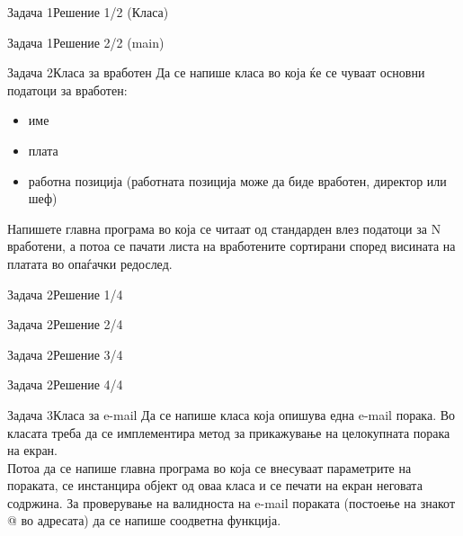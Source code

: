 \begin{frame}[fragile]{Задача 1}{Решение 1/2 (Класа)}

\end{frame}

\begin{frame}[fragile]{Задача 1}{Решение 2/2 (main)}

\end{frame}

\begin{frame}{Задача 2}{Класа за вработен}
Да се напише класа во која ќе се чуваат основни податоци за вработен:
\begin{itemize}
  \item име
  \item плата
  \item работна позиција (работната позиција може да биде вработен, директор
или шеф)
\end{itemize}
Напишете главна програма во која се читаат од стандарден влез податоци за N
вработени, а потоа се пачати листа на вработените сортирани според висината на
платата во опаѓачки редослед.
\end{frame}

\begin{frame}[fragile]{Задача 2}{Решение 1/4}

\end{frame}

\begin{frame}[fragile]{Задача 2}{Решение 2/4}

\end{frame}

\begin{frame}[fragile]{Задача 2}{Решение 3/4}

\end{frame}

\begin{frame}[fragile]{Задача 2}{Решение 4/4}

\end{frame}

\begin{frame}{Задача 3}{Класа за e-mail}
Да се напише класа која опишува една e-mail порака. Во класата треба да се
имплементира метод за прикажување на целокупната порака на екран.\\
Потоа да се напише главна програма во која се внесуваат параметрите на пораката,
се инстанцира објект од оваа класа и се печати на екран неговата содржина. За
проверување на валидноста на e-mail пораката (постоење на знакот @ во адресата)
да се напише соодветна функција.
\end{frame}


